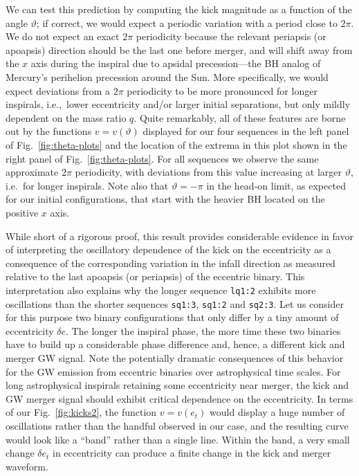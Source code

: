 \documentclass[floats,floatfix,showpacs,amssymb,physrev,twocolumn,superscriptaddress,reprint,
nofootinbib, longbibliography]{revtex4-2}
\begin{document}
We can test this prediction by computing the kick magnitude
as a function of the angle $\vartheta$; if correct, we would
expect a periodic variation with a period close to $2\pi$.
We do not expect an exact $2\pi$ periodicity because the
relevant periapsis (or apoapsis) direction should be the last one before merger,
and will shift away from the $x$ axis during the inspiral
due to 
apsidal precession---the BH analog
of Mercury's perihelion precession around the Sun. More
specifically, we would expect deviations from a $2\pi$ periodicity
to be more pronounced for longer inspirals, i.e.,~lower eccentricity
and/or larger initial separations, but only mildly
dependent on the mass ratio $q$.
Quite remarkably, all of these
features are borne out by the functions $v = v(\vartheta)$
displayed for our four sequences in the left panel of 
Fig.~\ref{fig:theta-plots}
and the location of the extrema in this plot shown in 
the right panel of Fig.~\ref{fig:theta-plots}.
For all sequences we observe the same approximate $2\pi$ periodicity,
with deviations from this value increasing at larger
$\vartheta$, i.e.~for longer inspirals.
Note also that $\vartheta=-\pi$ in the head-on limit, as expected
for our initial configurations, that start with the heavier BH
located on the positive $x$ axis.

While short of a rigorous proof, this result provides considerable
evidence in favor of interpreting the oscillatory dependence of the
kick on the eccentricity as a consequence of the corresponding
variation in the infall direction as measured relative to the last
apoapsis (or periapsis) of the eccentric binary. This interpretation
also explains why the longer sequence \texttt{lq1:2} exhibits more
oscillations than the shorter sequences \texttt{sq1:3}, \texttt{sq1:2}
and \texttt{sq2:3}. Let us consider for this purpose two binary
configurations that only differ by a tiny amount of eccentricity
$\delta e$. The longer the inspiral phase, the more time these two
binaries have to build up a considerable phase difference and, hence,
a different kick and merger GW signal. Note the potentially dramatic
consequences of this behavior for the GW emission from eccentric
binaries over astrophysical time scales. For long astrophysical
inspirals retaining some eccentricity near merger,
the kick and GW merger signal should exhibit critical dependence on
the eccentricity. In terms of our Fig.~\ref{fig:kicks2}, the function
$v=v(e_t)$ would display a huge number of oscillations rather than the
handful observed in our case, and the resulting curve would look like
a ``band'' rather than a single line. Within the band, a very small
change $\delta e_t$ in eccentricity can produce a finite change in the
kick and merger waveform.
\end{document}
